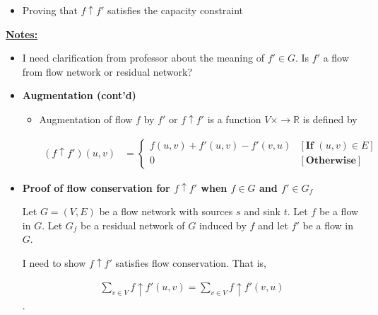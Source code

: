 \documentclass[12pt]{article}
\begin{document}
\begin{enumerate}[1.]
\begin{itemize}
        \begin{enumerate}[1)]
            \item
        \end{enumerate}

        \item Proving that $f \uparrow f'$ satisfies the capacity constraint
    \end{itemize}

    \bigskip

    \underline{\textbf{Notes:}}

    \bigskip

    \begin{itemize}
        \item I need clarification from professor about the meaning of $f' \in G$.
        Is $f'$ a flow from flow network or residual network?
        \item \textbf{Augmentation (cont'd)}

        \begin{itemize}
            \item Augmentation of flow $f$ by $f'$ or $f \uparrow f'$ is a function
            $V \times  \to \mathbb{R}$ is defined by


            \begin{align}
                (f \uparrow f')(u,v) &= \begin{cases}
                    f(u,v) + f'(u,v) - f'(v,u) & [\textbf{If $(u,v) \in E$}]\\
                    0 & [\textbf{Otherwise}]
                \end{cases}
            \end{align}
        \end{itemize}

        \item \textbf{Proof of flow conservation for $f \uparrow f'$ when $f \in G$ and $f' \in G_f$}
        \setcounter{equation}{0}
        \bigskip

        Let $G = (V,E)$ be a flow network with sources $s$ and sink $t$. Let $f$
        be a flow in $G$. Let $G_f$ be a residual network of $G$ induced by $f$ and let $f'$ be
        a flow in $G$.

        \bigskip

        I need to show $f \uparrow f'$ satisfies flow conservation. That is,

        \begin{align}
        \sum\limits_{v \in V} f \uparrow f' (u,v) = \sum\limits_{v \in V} f \uparrow f' (v,u)
        \end{align}.


\end{itemize}
\end{enumerate}
\end{document}
